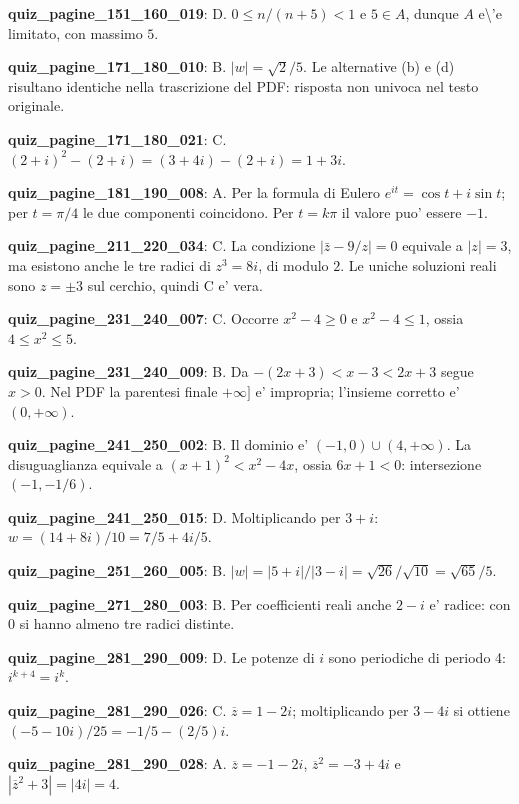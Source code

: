 \documentclass[11pt,a4paper]{article}
\newcounter{quiz}
\begin{document}
\noindent\textbf{quiz\_pagine\_151\_160\_019}: D. $0\leq n/(n+5)<1$ e $5\in A$, dunque $A$ e\textbackslash{}'e limitato, con massimo $5$.\par\medskip
\noindent\textbf{quiz\_pagine\_171\_180\_010}: B. $|w|=\sqrt2/5$. Le alternative (b) e (d) risultano identiche nella trascrizione del PDF: risposta non univoca nel testo originale.\par\medskip
\noindent\textbf{quiz\_pagine\_171\_180\_021}: C. $(2+i)^2-(2+i)=(3+4i)-(2+i)=1+3i$.\par\medskip
\noindent\textbf{quiz\_pagine\_181\_190\_008}: A. Per la formula di Eulero $e^{it}=\cos t+i\sin t$; per $t=\pi/4$ le due componenti coincidono. Per $t=k\pi$ il valore puo' essere $-1$.\par\medskip
\noindent\textbf{quiz\_pagine\_211\_220\_034}: C. La condizione $|\bar z-9/z|=0$ equivale a $|z|=3$, ma esistono anche le tre radici di $z^3=8i$, di modulo $2$. Le uniche soluzioni reali sono $z=\pm3$ sul cerchio, quindi C e' vera.\par\medskip
\noindent\textbf{quiz\_pagine\_231\_240\_007}: C. Occorre $x^2-4\geq0$ e $x^2-4\leq1$, ossia $4\leq x^2\leq5$.\par\medskip
\noindent\textbf{quiz\_pagine\_231\_240\_009}: B. Da $-(2x+3)<x-3<2x+3$ segue $x>0$. Nel PDF la parentesi finale $+\infty]$ e' impropria; l'insieme corretto e' $(0,+\infty)$.\par\medskip
\noindent\textbf{quiz\_pagine\_241\_250\_002}: B. Il dominio e' $(-1,0)\cup(4,+\infty)$. La disuguaglianza equivale a $(x+1)^2<x^2-4x$, ossia $6x+1<0$: intersezione $(-1,-1/6)$.\par\medskip
\noindent\textbf{quiz\_pagine\_241\_250\_015}: D. Moltiplicando per $3+i$: $w=(14+8i)/10=7/5+4i/5$.\par\medskip
\noindent\textbf{quiz\_pagine\_251\_260\_005}: B. $|w|=|5+i|/|3-i|=\sqrt{26}/\sqrt{10}=\sqrt{65}/5$.\par\medskip
\noindent\textbf{quiz\_pagine\_271\_280\_003}: B. Per coefficienti reali anche $2-i$ e' radice: con $0$ si hanno almeno tre radici distinte.\par\medskip
\noindent\textbf{quiz\_pagine\_281\_290\_009}: D. Le potenze di $i$ sono periodiche di periodo 4: $i^{k+4}=i^k$.\par\medskip
\noindent\textbf{quiz\_pagine\_281\_290\_026}: C. $\overline z=1-2i$; moltiplicando per $3-4i$ si ottiene $(-5-10i)/25=-1/5-(2/5)i$.\par\medskip
\noindent\textbf{quiz\_pagine\_281\_290\_028}: A. $\overline z=-1-2i$, $\overline z^2=-3+4i$ e $|\overline z^2+3|=|4i|=4$.\par\medskip
\end{document}
